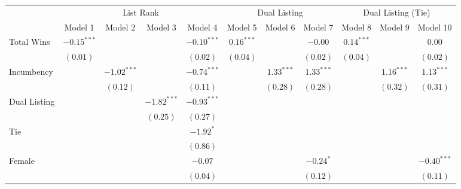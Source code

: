 
\begin{table}
\begin{center}
\begin{tabular}{l c c c c c c c c c c}
\hline
 & \multicolumn{4}{c}{List Rank} & \multicolumn{3}{c}{Dual Listing} & \multicolumn{3}{c}{Dual Listing (Tie)} \\
\cline{2-5} \cline{6-8} \cline{9-11}
 & Model 1 & Model 2 & Model 3 & Model 4 & Model 5 & Model 6 & Model 7 & Model 8 & Model 9 & Model 10 \\
\hline
Total Wins         & $-0.15^{***}$ &               &               & $-0.10^{***}$ & $0.16^{***}$ &              & $-0.00$      & $0.14^{***}$ &              & $0.00$        \\
                   & $(0.01)$      &               &               & $(0.02)$      & $(0.04)$     &              & $(0.02)$     & $(0.04)$     &              & $(0.02)$      \\
Incumbency         &               & $-1.02^{***}$ &               & $-0.74^{***}$ &              & $1.33^{***}$ & $1.33^{***}$ &              & $1.16^{***}$ & $1.13^{***}$  \\
                   &               & $(0.12)$      &               & $(0.11)$      &              & $(0.28)$     & $(0.28)$     &              & $(0.32)$     & $(0.31)$      \\
Dual Listing       &               &               & $-1.82^{***}$ & $-0.93^{***}$ &              &              &              &              &              &               \\
                   &               &               & $(0.25)$      & $(0.27)$      &              &              &              &              &              &               \\
Tie                &               &               &               & $-1.92^{*}$   &              &              &              &              &              &               \\
                   &               &               &               & $(0.86)$      &              &              &              &              &              &               \\
Female             &               &               &               & $-0.07$       &              &              & $-0.24^{*}$  &              &              & $-0.40^{***}$ \\
                   &               &               &               & $(0.04)$      &              &              & $(0.12)$     &              &              & $(0.11)$      \\

\end{tabular}
\end{center}
\end{table}
